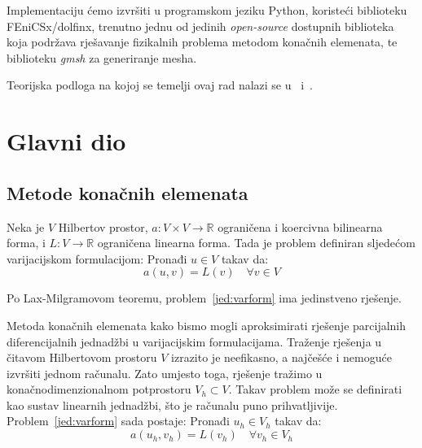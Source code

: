 \documentclass[zavrsnirad]{fer}
\begin{document}
Implementaciju ćemo izvršiti u programskom jeziku Python, koristeći biblioteku FEniCSx/dolfinx,
trenutno jednu od jedinih \textit{open-source} dostupnih biblioteka koja podržava rješavanje fizikalnih problema metodom konačnih elemenata,
te biblioteku \textit{gmsh} za generiranje mesha.

Teorijska podloga na kojoj se temelji ovaj rad nalazi se u~\cite{msfem_additive} i\ \cite{msfem_book}.

\chapter{Glavni dio}
\label{pog:glavni_dio}

\section{Metode konačnih elemenata}

Neka je $V$ Hilbertov prostor, $a : V \times V \to \mathbb{R}$ ograničena i koercivna bilinearna forma,
i $L : V \to \mathbb{R}$ ograničena linearna forma. Tada je problem definiran sljedećom varijacijskom formulacijom:
Pronađi $u \in V$ takav da:
\begin{equation}
  \label{jed:varform}
  a(u, v) = L(v) \quad \forall v \in V
\end{equation}

Po Lax-Milgramovom teoremu, problem\ \eqref{jed:varform} ima jedinstveno rješenje.

Metoda konačnih elemenata kako bismo mogli aproksimirati rješenje parcijalnih diferencijalnih jednadžbi u varijacijskim formulacijama.
Traženje rješenja u čitavom Hilbertovom prostoru $V$ izrazito je neefikasno, a najčešće i nemoguće izvršiti jednom računalu.
Zato umjesto toga, rješenje tražimo u konačnodimenzionalnom potprostoru $V_h \subset V$.
Takav problem može se definirati kao sustav linearnih jednadžbi, što je računalu puno prihvatljivije.
Problem\ \eqref{jed:varform} sada postaje: Pronađi $u_h \in V_h$ takav da:
\begin{equation}
  \label{jed:varform_fem}
  a(u_h, v_h) = L(v_h) \quad \forall v_h \in V_h
\end{equation}
\end{document}
